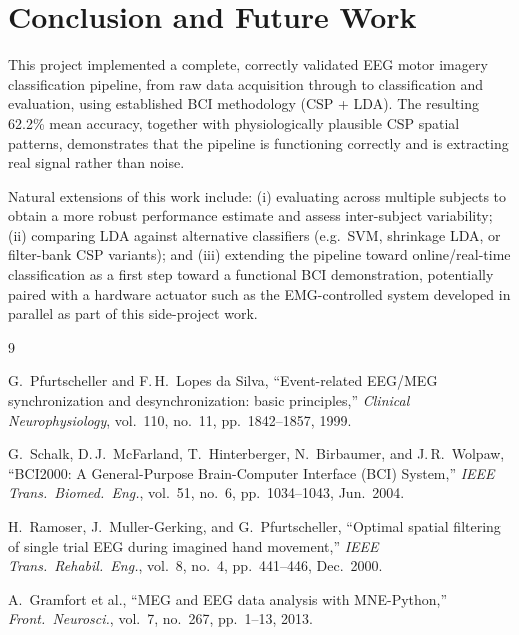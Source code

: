 \documentclass[conference]{IEEEtran}
\begin{document}
\section{Conclusion and Future Work}

This project implemented a complete, correctly validated EEG motor imagery classification pipeline, from raw data acquisition through to classification and evaluation, using established BCI methodology (CSP + LDA). The resulting 62.2\% mean accuracy, together with physiologically plausible CSP spatial patterns, demonstrates that the pipeline is functioning correctly and is extracting real signal rather than noise.

Natural extensions of this work include: (i) evaluating across multiple subjects to obtain a more robust performance estimate and assess inter-subject variability; (ii) comparing LDA against alternative classifiers (e.g.\ SVM, shrinkage LDA, or filter-bank CSP variants); and (iii) extending the pipeline toward online/real-time classification as a first step toward a functional BCI demonstration, potentially paired with a hardware actuator such as the EMG-controlled system developed in parallel as part of this side-project work.

\begin{thebibliography}{9}

G.\ Pfurtscheller and F.\,H.\ Lopes da Silva, ``Event-related EEG/MEG synchronization and desynchronization: basic principles,'' \textit{Clinical Neurophysiology}, vol.\ 110, no.\ 11, pp.\ 1842--1857, 1999.

G.\ Schalk, D.\,J.\ McFarland, T.\ Hinterberger, N.\ Birbaumer, and J.\,R.\ Wolpaw, ``BCI2000: A General-Purpose Brain-Computer Interface (BCI) System,'' \textit{IEEE Trans.\ Biomed.\ Eng.}, vol.\ 51, no.\ 6, pp.\ 1034--1043, Jun.\ 2004.

H.\ Ramoser, J.\ Muller-Gerking, and G.\ Pfurtscheller, ``Optimal spatial filtering of single trial EEG during imagined hand movement,'' \textit{IEEE Trans.\ Rehabil.\ Eng.}, vol.\ 8, no.\ 4, pp.\ 441--446, Dec.\ 2000.

A.\ Gramfort et al., ``MEG and EEG data analysis with MNE-Python,'' \textit{Front.\ Neurosci.}, vol.\ 7, no.\ 267, pp.\ 1--13, 2013.

\end{thebibliography}
\end{document}
